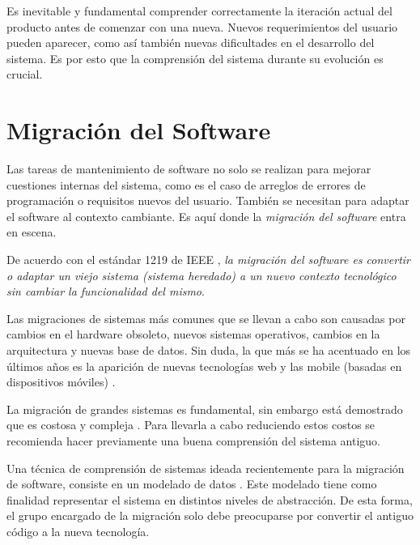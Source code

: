 Es inevitable y fundamental comprender correctamente la iteración actual del producto antes de comenzar con una nueva. Nuevos requerimientos del usuario pueden aparecer, como así también nuevas dificultades en el desarrollo del sistema. Es por esto que la comprensión del sistema durante su evolución es crucial.



\section{Migración del Software}

Las tareas de mantenimiento de software no solo se realizan para mejorar cuestiones internas del sistema, como es el caso de arreglos de errores de programación o requisitos nuevos del usuario. También se necesitan para adaptar el software al contexto cambiante. Es aquí donde la \textit{migración del software} entra en escena.
 
De acuerdo con el estándar 1219 de IEEE  \cite{STD1219}, \textit{la migración del software es convertir o adaptar un viejo sistema (sistema heredado) a un nuevo contexto tecnológico sin cambiar la funcionalidad del mismo}.

Las migraciones de sistemas más comunes que se llevan a cabo son causadas por cambios en el hardware obsoleto, nuevos sistemas operativos, cambios en la arquitectura y nuevas base de datos. Sin duda, la que más se ha acentuado en los últimos años es la aparición de nuevas tecnologías web y las mobile (basadas en dispositivos móviles) \cite{MMFAF08}.
 
La migración de grandes sistemas es fundamental, sin embargo está demostrado que es costosa y compleja \cite{MMFAF08,ZOYI03,LGCCA01,ZYKK02}. Para llevarla a cabo reduciendo estos costos se recomienda hacer previamente una buena comprensión del sistema antiguo. 

Una técnica de comprensión de sistemas ideada recientemente para la migración de software, consiste en un mode\-lado de datos \cite{WHAFVR11}. Este modelado tiene como finalidad representar el sistema en distintos niveles de abstracción. De esta forma, el grupo encargado de la migración solo debe preocuparse por convertir el antiguo código a la nueva tecnología.


